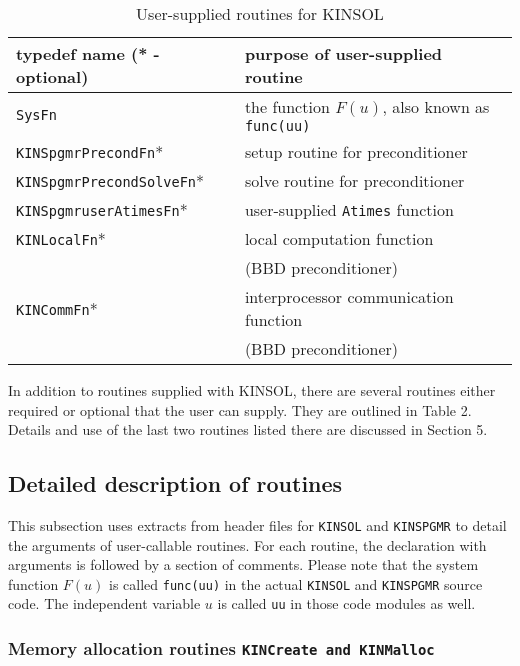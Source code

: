 \documentclass[11pt]{article}
\begin{document}
\begin{table}%
\begin{center}
\caption{User-supplied routines for KINSOL}
\label{user-supplied-routines}
\vspace{.1 in}
\begin{tabular}{|l|l|} \hline
typedef name  (* - optional) &  purpose of user-supplied routine \\ \hline \hline
{\tt SysFn} & the function ${F(u)}$, also known as {\tt func(uu)} \\  \hline
{\tt KINSpgmrPrecondFn}* & setup routine for preconditioner \\ \hline
{\tt KINSpgmrPrecondSolveFn}* & solve routine for preconditioner \\ \hline
{\tt KINSpgmruserAtimesFn}* & user-supplied {\tt Atimes} function \\ \hline
{\tt KINLocalFn}* & local computation function \\
 & (BBD preconditioner) \\ \hline
{\tt KINCommFn}* & interprocessor communication function \\
 & (BBD preconditioner) \\ \hline
\end{tabular}
\end{center}
\end{table}

In addition to routines supplied with KINSOL, there are several routines
either required or optional that the user can supply. They are outlined in
Table 2. Details and use of the last two routines listed there are discussed
in Section 5.


\subsection{Detailed description of routines}

This subsection uses extracts from header files for {\tt KINSOL} and 
{\tt KINSPGMR} to detail the arguments of user-callable routines. For each
routine, the declaration with arguments is followed by a section of comments. 
Please note that the system function ${F(u)}$ is called {\tt func(uu)} in the 
actual {\tt KINSOL} and {\tt KINSPGMR} source code. The independent variable 
$u$ is called {\tt uu} in those code modules as well.

\subsubsection{Memory allocation routines {\tt KINCreate and KINMalloc}}
\end{document}
